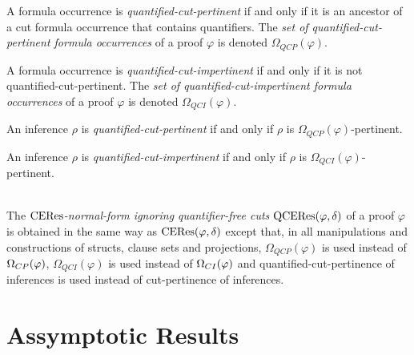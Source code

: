 \documentclass{llncs}
\begin{document}
\newcommand{\occCutPertQuant}[1]{\Omega_{QCP}(#1)}   %
\newcommand{\occCutImpertQuant}[1]{\Omega_{QCI}(#1)}   %
\begin{definition}
\label{definition:ComplexCutPertinenceOccurrences}
A formula occurrence is \emph{quantified-cut-pertinent} if and only if it is an ancestor of a cut formula occurrence that contains quantifiers. The \emph{set of quantified-cut-pertinent formula occurrences} of a proof $\varphi$ is denoted $\occCutPertQuant{\varphi}$.

A formula occurrence is \emph{quantified-cut-impertinent} if and only if it is not quantified-cut-pertinent. The \emph{set of quantified-cut-impertinent formula occurrences} of a proof $\varphi$ is denoted $\occCutImpertQuant{\varphi}$.
\end{definition}

\begin{definition}
\label{definition:CutPertinenceInferences}
An inference $\rho$ is \emph{quantified-cut-pertinent} if and only if $\rho$ is $\occCutPertQuant{\varphi}$-pertinent.

An inference $\rho$ is \emph{quantified-cut-impertinent} if and only if $\rho$ is $\occCutImpertQuant{\varphi}$-pertinent.
\end{definition}

\begin{definition}
\label{definition:CEResNormalFormIgnoringQuantifierFreeCuts} \hspace*{\fill} \\
The \emph{$\mathrm{CERes}$-normal-form ignoring quantifier-free cuts} $\mathrm{QCERes}(\varphi,\delta)$ of a proof $\varphi$ is obtained in the same way as $\mathrm{CERes}(\varphi,\delta)$ except that, in all manipulations and constructions of structs, clause sets and projections, $\occCutPertQuant{\varphi}$ is used instead of $\Omega_{CP}(\varphi)$, $\occCutImpertQuant{\varphi}$ is used instead of $\Omega_{CI}(\varphi)$ and quantified-cut-pertinence of inferences is used instead of cut-pertinence of inferences.
\end{definition}


\section{Assymptotic Results}
\end{document}
